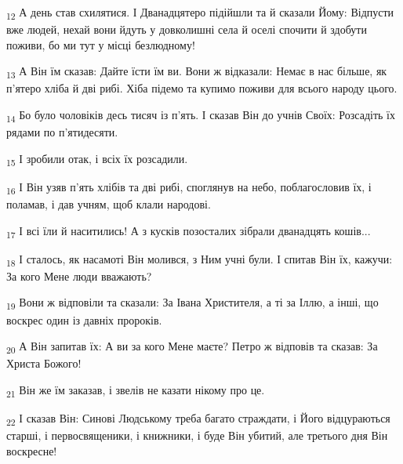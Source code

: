 \begin{tcolorbox}
\textsubscript{12} А день став схилятися. І Дванадцятеро підійшли та й сказали Йому: Відпусти вже людей, нехай вони йдуть у довколишні села й оселі спочити й здобути поживи, бо ми тут у місці безлюдному!
\end{tcolorbox}
\begin{tcolorbox}
\textsubscript{13} А Він їм сказав: Дайте їсти їм ви. Вони ж відказали: Немає в нас більше, як п'ятеро хліба й дві рибі. Хіба підемо та купимо поживи для всього народу цього.
\end{tcolorbox}
\begin{tcolorbox}
\textsubscript{14} Бо було чоловіків десь тисяч із п'ять. І сказав Він до учнів Своїх: Розсадіть їх рядами по п'ятидесяти.
\end{tcolorbox}
\begin{tcolorbox}
\textsubscript{15} І зробили отак, і всіх їх розсадили.
\end{tcolorbox}
\begin{tcolorbox}
\textsubscript{16} І Він узяв п'ять хлібів та дві рибі, споглянув на небо, поблагословив їх, і поламав, і дав учням, щоб клали народові.
\end{tcolorbox}
\begin{tcolorbox}
\textsubscript{17} І всі їли й наситились! А з кусків позосталих зібрали дванадцять кошів...
\end{tcolorbox}
\begin{tcolorbox}
\textsubscript{18} І сталось, як насамоті Він молився, з Ним учні були. І спитав Він їх, кажучи: За кого Мене люди вважають?
\end{tcolorbox}
\begin{tcolorbox}
\textsubscript{19} Вони ж відповіли та сказали: За Івана Христителя, а ті за Іллю, а інші, що воскрес один із давніх пророків.
\end{tcolorbox}
\begin{tcolorbox}
\textsubscript{20} А Він запитав їх: А ви за кого Мене маєте? Петро ж відповів та сказав: За Христа Божого!
\end{tcolorbox}
\begin{tcolorbox}
\textsubscript{21} Він же їм заказав, і звелів не казати нікому про це.
\end{tcolorbox}
\begin{tcolorbox}
\textsubscript{22} І сказав Він: Синові Людському треба багато страждати, і Його відцураються старші, і первосвященики, і книжники, і буде Він убитий, але третього дня Він воскресне!
\end{tcolorbox}
